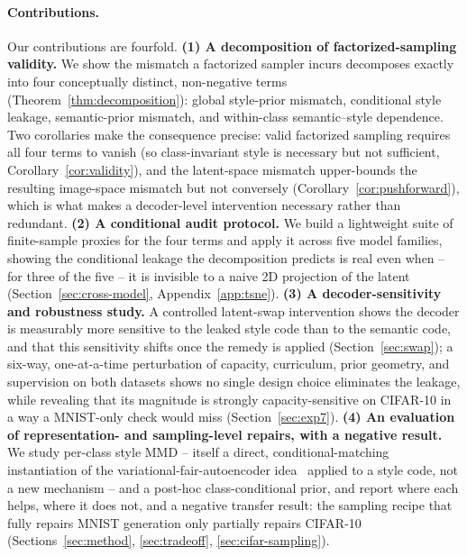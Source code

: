 \documentclass[10pt,letterpaper]{article}
\begin{document}
\paragraph{Contributions.}
Our contributions are fourfold.
\textbf{(1) A decomposition of factorized-sampling validity.} We show the
mismatch a factorized sampler incurs decomposes exactly into four
conceptually distinct, non-negative terms
(Theorem~\ref{thm:decomposition}): global style-prior mismatch, conditional
style leakage, semantic-prior mismatch, and within-class semantic--style
dependence. Two corollaries make the consequence precise: valid factorized
sampling requires all four terms to vanish (so class-invariant style is
necessary but not sufficient, Corollary~\ref{cor:validity}), and the
latent-space mismatch upper-bounds the resulting image-space mismatch but
not conversely (Corollary~\ref{cor:pushforward}), which is what makes a
decoder-level intervention necessary rather than redundant.
\textbf{(2) A conditional audit protocol.} We build a lightweight suite of
finite-sample proxies for the four terms and apply it across five model
families, showing the conditional leakage the decomposition predicts is
real even when -- for three of the five -- it is invisible to a naive 2D
projection of the latent (Section~\ref{sec:cross-model},
Appendix~\ref{app:tsne}).
\textbf{(3) A decoder-sensitivity and robustness study.} A controlled
latent-swap intervention shows the decoder is measurably more sensitive to
the leaked style code than to the semantic code, and that this sensitivity
shifts once the remedy is applied (Section~\ref{sec:swap}); a six-way,
one-at-a-time perturbation of capacity, curriculum, prior geometry, and
supervision on both datasets shows no single design choice eliminates the
leakage, while revealing that its magnitude is strongly capacity-sensitive
on CIFAR-10 in a way a MNIST-only check would miss (Section~\ref{sec:exp7}).
\textbf{(4) An evaluation of representation- and sampling-level repairs,
with a negative result.} We study per-class style MMD -- itself a direct,
conditional-matching instantiation of the variational-fair-autoencoder
idea~\citep{louizos2015variational} applied to a style code, not a new
mechanism -- and a post-hoc class-conditional prior, and report where each
helps, where it does not, and a negative transfer result: the sampling
recipe that fully repairs MNIST generation only partially repairs CIFAR-10
(Sections~\ref{sec:method}, \ref{sec:tradeoff}, \ref{sec:cifar-sampling}).

\end{document}
